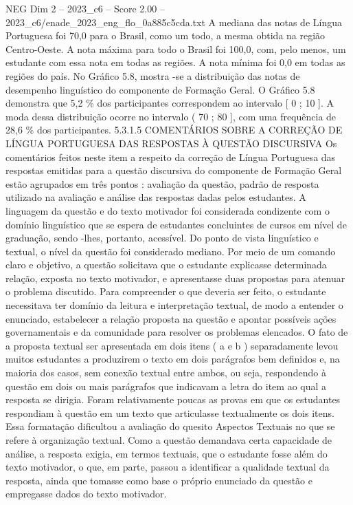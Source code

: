 \begin{textsample}{NEG Dim 2 – 2023\_c6 – Score 2.00 – 2023\_c6/enade\_2023\_eng\_flo\_0a885c5cda.txt}
A mediana das notas de Língua Portuguesa foi 70,0 para o Brasil, como um todo, a mesma obtida na região Centro-Oeste.
A nota máxima para todo o Brasil foi 100,0, com, pelo menos, um estudante com essa nota em todas as regiões.
A nota mínima foi 0,0 em todas as regiões do país.
No Gráfico 5.8, mostra -se a distribuição das notas de desempenho linguístico do componente de Formação Geral.
O Gráfico 5.8 demonstra que 5,2 \% dos participantes correspondem ao intervalo [ 0 ; 10 ].
A moda dessa distribuição ocorre no intervalo ( 70 ; 80 ], com uma frequência de 28,6 \% dos participantes. 5.3.1.5 COMENTÁRIOS SOBRE A CORREÇÃO DE LÍNGUA PORTUGUESA DAS RESPOSTAS À QUESTÃO DISCURSIVA Os comentários feitos neste item a respeito da correção de Língua Portuguesa das respostas emitidas para a questão discursiva do componente de Formação Geral estão agrupados em três pontos : avaliação da questão, padrão de resposta utilizado na avaliação e análise das respostas dadas pelos estudantes.
A linguagem da questão e do texto motivador foi considerada condizente com o domínio linguístico que se espera de estudantes concluintes de cursos em nível de graduação, sendo -lhes, portanto, acessível.
Do ponto de vista linguístico e textual, o nível da questão foi considerado mediano.
Por meio de um comando claro e objetivo, a questão solicitava que o estudante explicasse determinada relação, exposta no texto motivador, e apresentasse duas propostas para atenuar o problema discutido.
Para compreender o que deveria ser feito, o estudante necessitava ter domínio da leitura e interpretação textual, de modo a entender o enunciado, estabelecer a relação proposta na questão e apontar possíveis ações governamentais e da comunidade para resolver os problemas elencados.
O fato de a proposta textual ser apresentada em dois itens ( a e b ) separadamente levou muitos estudantes a produzirem o texto em dois parágrafos bem definidos e, na maioria dos casos, sem conexão textual entre ambos, ou seja, respondendo à questão em dois ou mais parágrafos que indicavam a letra do item ao qual a resposta se dirigia.
Foram relativamente poucas as provas em que os estudantes respondiam à questão em um texto que articulasse textualmente os dois itens.
Essa formatação dificultou a avaliação do quesito Aspectos Textuais no que se refere à organização textual.
Como a questão demandava certa capacidade de análise, a resposta exigia, em termos textuais, que o estudante fosse além do texto motivador, o que, em parte, passou a identificar a qualidade textual da resposta, ainda que tomasse como base o próprio enunciado da questão e empregasse dados do texto motivador.

\end{textsample}
